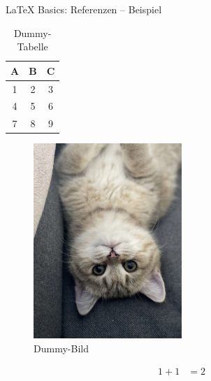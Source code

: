 \documentclass[main.tex]{subfiles}
\begin{document}
\begin{frame}{\LaTeX{} Basics: Referenzen -- Beispiel}
    \begin{minipage}[t][][b]{0.49\textwidth}
        \begin{table}[h]
            \centering
            \begin{tabular}{|c|c|c|}
                \hline
                \textbf{A} & \textbf{B} & \textbf{C} \\
                \hline
                1          & 2          & 3          \\
                \hline
                4          & 5          & 6          \\
                \hline
                7          & 8          & 9          \\
                \hline
            \end{tabular}
            \vspace{42pt}
            \caption{Dummy-Tabelle}
            \label{tab:dummy}
        \end{table}
    \end{minipage}
    \begin{minipage}[t][][b]{0.49\textwidth}
        \begin{figure}
            \centering
            \includegraphics[width=0.5\textwidth]{images/DummyCatPicture}
            \caption{Dummy-Bild}
            \label{fig:dummy}
        \end{figure}
    \end{minipage}

    \begin{align}
        1+1 & = 2 \label{eq:dummy}
    \end{align}
\end{frame}
\end{document}

